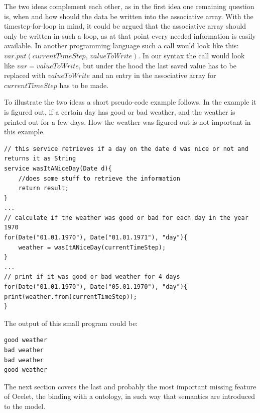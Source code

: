 \par
The two ideas complement each other, as in the first idea one remaining question is, when and how should the data be written into the associative array. With the timestep-for-loop in mind, it could be argued that the associative array should only be written in such a loop, as at that point every needed information is easily available. In another programming language such a call would look like this: $var.put(currentTimeStep,\, valueToWrite)$. In our syntax the call would look like $var = valueToWrite$, but under the hood the last saved value has to be replaced with $valueToWrite$ and an entry in the associative array for $currentTimeStep$ has to be made.
\par
To illustrate the two ideas a short pseudo-code example follows. In the example it is figured out, if a certain day has good or bad weather, and the weather is printed out for a few days. How the weather was figured out is not important in this example.
\begin{lstlisting}
// this service retrieves if a day on the date d was nice or not and returns it as String
service wasItANiceDay(Date d){
    //does some stuff to retrieve the information
    return result;
}
...
// calculate if the weather was good or bad for each day in the year 1970
for(Date("01.01.1970"), Date("01.01.1971"), "day"){
    weather = wasItANiceDay(currentTimeStep);
}
...
// print if it was good or bad weather for 4 days
for(Date("01.01.1970"), Date("05.01.1970"), "day"){
print(weather.from(currentTimeStep));
}
\end{lstlisting}

\par
The output of this small program could be:
\begin{lstlisting}
good weather
bad weather
bad weather
good weather
\end{lstlisting}
The next section covers the last and probably the most important missing feature of Ocelet, the binding with a ontology, in such way that semantics are introduced to the model.





